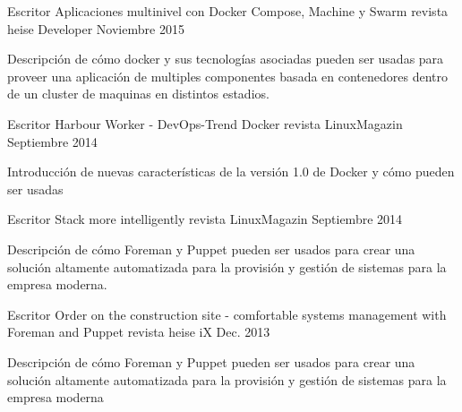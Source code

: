 {}


\begin{cventries}

  \cventry
  {Escritor} %
    {Aplicaciones multinivel con Docker Compose, Machine y Swarm}
    {revista heise Developer} %
    {Noviembre 2015} %
    {
      \begin{cvitems} %
      \item {Descripción de cómo docker y sus tecnologías asociadas pueden ser usadas para proveer una aplicación de multiples componentes basada en contenedores dentro de un cluster de maquinas en distintos estadios.}
      \end{cvitems}
    }

  \cventry
  {Escritor} %
    {Harbour Worker - DevOps-Trend Docker} %
    {revista LinuxMagazin} %
    {Septiembre 2014} %
    {
      \begin{cvitems} %
        \item {Introducción de nuevas características de la versión 1.0 de Docker y cómo pueden ser usadas}
      \end{cvitems}
    }
  \cventry
  {Escritor} %
    {Stack more intelligently} %
    {revista LinuxMagazin} %
    {Septiembre 2014} %
    {
      \begin{cvitems} %
        \item {Descripción de cómo Foreman y Puppet pueden ser usados para crear una solución altamente automatizada para la provisión y gestión de sistemas para la empresa moderna.}
      \end{cvitems}
    }
  \cventry
  {Escritor} %
    {Order on the construction site - comfortable systems management with Foreman and Puppet} %
    {revista heise iX} %
    {Dec. 2013} %
    {
      \begin{cvitems} %
        \item {Descripción de cómo Foreman y Puppet pueden ser usados para crear una solución altamente automatizada para la provisión y gestión de sistemas para la empresa moderna}
      \end{cvitems}
    }

\end{cventries}
